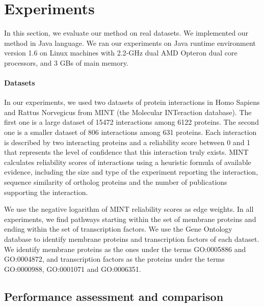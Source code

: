 
\section{Experiments}
\label{sec:exp}

In this section, we evaluate our method on real datasets. We
implemented our method in Java language. We ran our experiments on Java
runtime environment version 1.6 on Linux machines with 2.2-GHz dual AMD Opteron
dual core processors, and 3 GBs of main memory.

\paragraph{Datasets}
In our experiments, we used two datasets of protein interactions
in Homo Sapiens and Rattus Norvegicus from MINT\cite{mint1} (the Molecular
INTeraction database). The first one is a large dataset of 15472 interactions
among 6122 proteins. The second one is a smaller dataset of 806 interactions
among 631 proteins. Each interaction is described by two interacting proteins and a
reliability score between 0 and 1 that represents the level of confidence that
this interaction truly exists. MINT calculates reliability scores of
interactions using a heuristic formula of available evidence, including the
size and type of the experiment reporting the interaction, sequence similarity
of ortholog proteins and the number of publications supporting the
interaction\cite{mint2}. 

We use the negative logarithm of MINT reliability scores as edge weights. In all
experiments, we find pathways starting within the set of membrane proteins and
ending within the set of transcription factors. We use the Gene Ontology
database\cite{go} to identify membrane proteins and transcription factors of each
dataset. We identify membrane proteins as the ones under the terms GO:0005886
and GO:0004872, and transcription factors as the proteins under the terms
GO:0000988, GO:0001071 and GO:0006351.

\subsection{Performance assessment and comparison}


